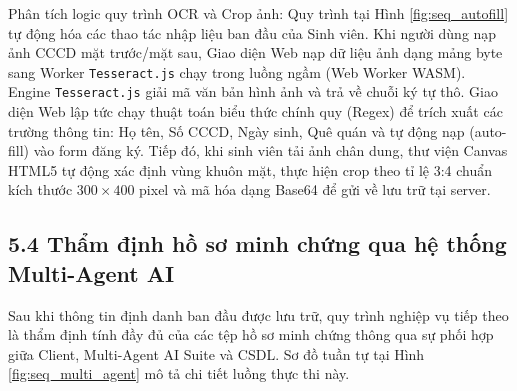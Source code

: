 \documentclass[12pt,a4paper]{report}
\begin{document}
Phân tích logic quy trình OCR và Crop ảnh: Quy trình tại Hình \ref{fig:seq_autofill} tự động hóa các thao tác nhập liệu ban đầu của Sinh viên. Khi người dùng nạp ảnh CCCD mặt trước/mặt sau, Giao diện Web nạp dữ liệu ảnh dạng mảng byte sang Worker \texttt{Tesseract.js} chạy trong luồng ngầm (Web Worker WASM). Engine \texttt{Tesseract.js} giải mã văn bản hình ảnh và trả về chuỗi ký tự thô. Giao diện Web lập tức chạy thuật toán biểu thức chính quy (Regex) để trích xuất các trường thông tin: Họ tên, Số CCCD, Ngày sinh, Quê quán và tự động nạp (auto-fill) vào form đăng ký. Tiếp đó, khi sinh viên tải ảnh chân dung, thư viện Canvas HTML5 tự động xác định vùng khuôn mặt, thực hiện crop theo tỉ lệ 3:4 chuẩn kích thước $300 \times 400$ pixel và mã hóa dạng Base64 để gửi về lưu trữ tại server.

\subsection*{5.4 Thẩm định hồ sơ minh chứng qua hệ thống Multi-Agent AI}
Sau khi thông tin định danh ban đầu được lưu trữ, quy trình nghiệp vụ tiếp theo là thẩm định tính đầy đủ của các tệp hồ sơ minh chứng thông qua sự phối hợp giữa Client, Multi-Agent AI Suite và CSDL. Sơ đồ tuần tự tại Hình \ref{fig:seq_multi_agent} mô tả chi tiết luồng thực thi này.
\end{document}
